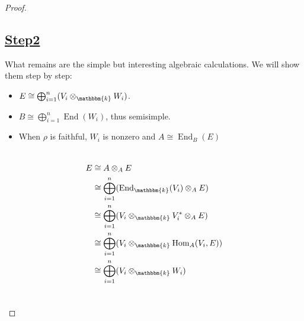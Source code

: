\documentclass[11pt,oneside]{amsart}
\numberwithin{equation}{section}
\theoremstyle{plain}
\theoremstyle{plain}
\numberwithin{equation}{section}
\theoremstyle{remark}
\newcommand{\Hom}{\operatorname{Hom}}
\newcommand{\End}{\operatorname{End}}
\begin{document}
\begin{proof}
		\subsection*{\underline{Step2}} 
		What remains are the simple but interesting algebraic calculations. We will show them step by step:
		\begin{itemize}
			\item $E \cong \bigoplus_{i=1}^n (V_i \otimes_{\mathbbm{k}}W_i)$.
			\item $B \cong \bigoplus_{i=1}^n \End(W_i)$, thus semisimple.
			\item When $\rho$ is faithful, $W_i$ is nonzero and $A \cong \End_B(E)$
		\end{itemize}
	\begin{minipage}[t]{.39\textwidth}
	\begin{equation*}
\begin{aligned}
&\\
E&\cong A \otimes_A E\\
&\cong \bigoplus_{i=1}^n (\End_{\mathbbm{k}}(V_i) \otimes_A E)\\
&\cong \bigoplus_{i=1}^n (V_i \otimes_{\mathbbm{k}} V_i^* \otimes_A E)\\
&\cong \bigoplus_{i=1}^n (V_i \otimes_{\mathbbm{k}} \Hom_A (V_i,E))\\
&\cong\bigoplus_{i=1}^n (V_i \otimes_{\mathbbm{k}}W_i)\\
\end{aligned}
\end{equation*}
	\end{minipage}
	\begin{minipage}[t]{.01\textwidth}
		 \begin{equation*}
	\begin{array}{c||c}
	&	\\
	&\\
	&\\
	

\end{array}
\end{equation*}
\end{minipage}
\end{proof}
\end{document}
